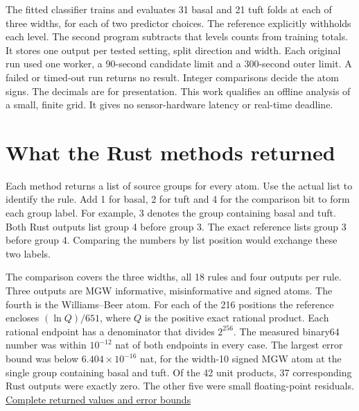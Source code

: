 \clearpage

The fitted classifier trains and evaluates 31 basal and 21 tuft folds at each of three widths, for each of two predictor choices. The reference explicitly withholds each level. The second program subtracts that level\textquotesingle s counts from training totals. It stores one output per tested setting, split direction and width. Each original run used one worker, a 90-second candidate limit and a 300-second outer limit. A failed or timed-out run returns no result. Integer comparisons decide the atom signs. The decimals are for presentation. This work qualifies an offline analysis of a small, finite grid. It gives no sensor-hardware latency or real-time deadline.

\section{What the Rust methods returned}\label{what-the-rust-methods-returned}

Each method returns a list of source groups for every atom. Use the actual list to identify the rule. Add 1 for basal, 2 for tuft and 4 for the comparison bit to form each group label. For example, 3 denotes the group containing basal and tuft. Both Rust outputs list group 4 before group 3. The exact reference lists group 3 before group 4. Comparing the numbers by list position would exchange these two labels.

The comparison covers the three widths, all 18 rules and four outputs per rule. Three outputs are MGW informative, misinformative and signed atoms. The fourth is the Williams--Beer atom. For each of the 216 positions the reference encloses \((\ln Q)/651\), where \(Q\) is the positive exact rational product. Each rational endpoint has a denominator that divides \(2^{256}\). The measured binary64 number was within \(10^{-12}\) nat of both endpoints in every case. The largest error bound was below \(6.404\times10^{-16}\) nat, for the width-10 signed MGW atom at the single group containing basal and tuft. Of the 42 unit products, 37 corresponding Rust outputs were exactly zero. The other five were small floating-point residuals. \href{https://github.com/sepahead/pid-rs/blob/main/audit/research/dendritic-stimulus-resolution/rust-comparison/result.json}{Complete returned values and error bounds}

